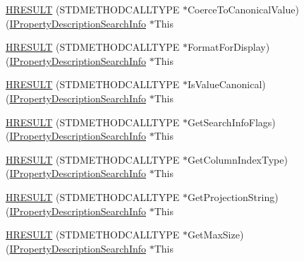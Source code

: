 \begin{DoxyCompactItemize}
\item 
\hyperlink{struct_i_property_description_search_info_vtbl_a6aa12536b72676ade82a82d7c5d6470c}{H\+R\+E\+S\+U\+LT} (S\+T\+D\+M\+E\+T\+H\+O\+D\+C\+A\+L\+L\+T\+Y\+PE $\ast$Coerce\+To\+Canonical\+Value)(\hyperlink{propsys_8h_af859793a501f0bcd88d72a4382caa467}{I\+Property\+Description\+Search\+Info} $\ast$This
\item 
\hyperlink{struct_i_property_description_search_info_vtbl_a47129fbea2912e9526bebde09c45d4b8}{H\+R\+E\+S\+U\+LT} (S\+T\+D\+M\+E\+T\+H\+O\+D\+C\+A\+L\+L\+T\+Y\+PE $\ast$Format\+For\+Display)(\hyperlink{propsys_8h_af859793a501f0bcd88d72a4382caa467}{I\+Property\+Description\+Search\+Info} $\ast$This
\item 
\hyperlink{struct_i_property_description_search_info_vtbl_ab1ad89a6d8b47e1a5774d3272d05d288}{H\+R\+E\+S\+U\+LT} (S\+T\+D\+M\+E\+T\+H\+O\+D\+C\+A\+L\+L\+T\+Y\+PE $\ast$Is\+Value\+Canonical)(\hyperlink{propsys_8h_af859793a501f0bcd88d72a4382caa467}{I\+Property\+Description\+Search\+Info} $\ast$This
\item 
\hyperlink{struct_i_property_description_search_info_vtbl_a54b68f0b8540bf9d4cf0fc618638d888}{H\+R\+E\+S\+U\+LT} (S\+T\+D\+M\+E\+T\+H\+O\+D\+C\+A\+L\+L\+T\+Y\+PE $\ast$Get\+Search\+Info\+Flags)(\hyperlink{propsys_8h_af859793a501f0bcd88d72a4382caa467}{I\+Property\+Description\+Search\+Info} $\ast$This
\item 
\hyperlink{struct_i_property_description_search_info_vtbl_afb0fb6c9a5cdeb0426f171e18fa234b5}{H\+R\+E\+S\+U\+LT} (S\+T\+D\+M\+E\+T\+H\+O\+D\+C\+A\+L\+L\+T\+Y\+PE $\ast$Get\+Column\+Index\+Type)(\hyperlink{propsys_8h_af859793a501f0bcd88d72a4382caa467}{I\+Property\+Description\+Search\+Info} $\ast$This
\item 
\hyperlink{struct_i_property_description_search_info_vtbl_aefd3f8f5b9bde993887fc5c2c83d9da2}{H\+R\+E\+S\+U\+LT} (S\+T\+D\+M\+E\+T\+H\+O\+D\+C\+A\+L\+L\+T\+Y\+PE $\ast$Get\+Projection\+String)(\hyperlink{propsys_8h_af859793a501f0bcd88d72a4382caa467}{I\+Property\+Description\+Search\+Info} $\ast$This
\item 
\hyperlink{struct_i_property_description_search_info_vtbl_a6ffb9687884834d775fa6b7fc62ee0a4}{H\+R\+E\+S\+U\+LT} (S\+T\+D\+M\+E\+T\+H\+O\+D\+C\+A\+L\+L\+T\+Y\+PE $\ast$Get\+Max\+Size)(\hyperlink{propsys_8h_af859793a501f0bcd88d72a4382caa467}{I\+Property\+Description\+Search\+Info} $\ast$This
\end{DoxyCompactItemize}
